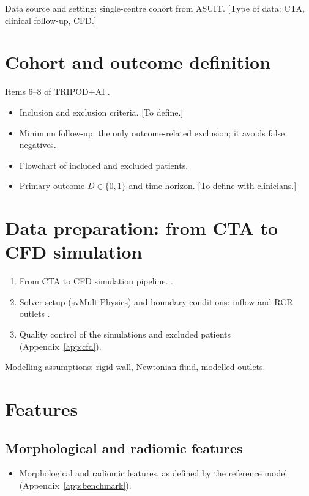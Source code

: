 Data source and setting: single-centre cohort from ASUIT. {[}Type of data: CTA, clinical follow-up, CFD.]

\section{Cohort and outcome definition}
Items 6--8 of TRIPOD+AI \cite{collins_tripodai_2024}.
\begin{itemize}
    \item Inclusion and exclusion criteria. {[}To define.]
    \item Minimum follow-up: the only outcome-related exclusion; it avoids false negatives.
    \item Flowchart of included and excluded patients.
    \item Primary outcome $D \in \{0,1\}$ and time horizon. {[}To define with clinicians.]
\end{itemize}

\section{Data preparation: from CTA to CFD simulation}
\begin{enumerate}
    \item From CTA to CFD simulation pipeline.  \cite{lasso_slicerheart_2022, trentin_automatic_2015}.
    \item Solver setup (svMultiPhysics) and boundary conditions: inflow and RCR outlets \cite{du_outflow_2015, ramazanli_modeling_2025, les_quantification_2010}. 
    \item Quality control of the simulations and excluded patients (Appendix~\ref{app:cfd}).
\end{enumerate}
Modelling assumptions: rigid wall, Newtonian fluid, modelled outlets.

\section{Features}

\subsection{Morphological and radiomic features}
\begin{itemize}
    \item Morphological and radiomic features, as defined by the reference model (Appendix~\ref{app:benchmark}).
\end{itemize}

